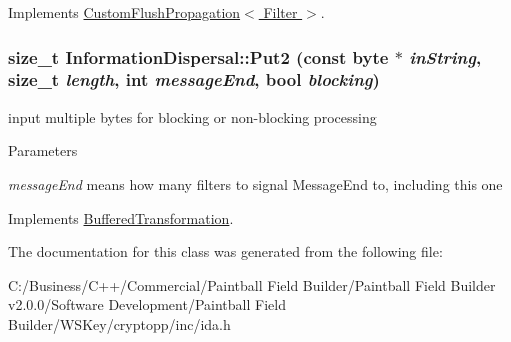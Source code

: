 Implements \hyperlink{class_custom_flush_propagation}{CustomFlushPropagation$<$ Filter $>$}.\hypertarget{class_information_dispersal_a0dd51a1bdc83cea84cd72218730f4744}{
\subsubsection[{Put2}]{\setlength{\rightskip}{0pt plus 5cm}size\_\-t InformationDispersal::Put2 (const byte $\ast$ {\em inString}, \/  size\_\-t {\em length}, \/  int {\em messageEnd}, \/  bool {\em blocking})}}
\label{class_information_dispersal_a0dd51a1bdc83cea84cd72218730f4744}


input multiple bytes for blocking or non-\/blocking processing 
\begin{DoxyParams}{Parameters}
\item[{\em messageEnd}]means how many filters to signal MessageEnd to, including this one \end{DoxyParams}


Implements \hyperlink{class_buffered_transformation_ad396dcb42260f23125a35ec0e5d17d55}{BufferedTransformation}.

The documentation for this class was generated from the following file:\begin{DoxyCompactItemize}
\item 
C:/Business/C++/Commercial/Paintball Field Builder/Paintball Field Builder v2.0.0/Software Development/Paintball Field Builder/WSKey/cryptopp/inc/ida.h\end{DoxyCompactItemize}
